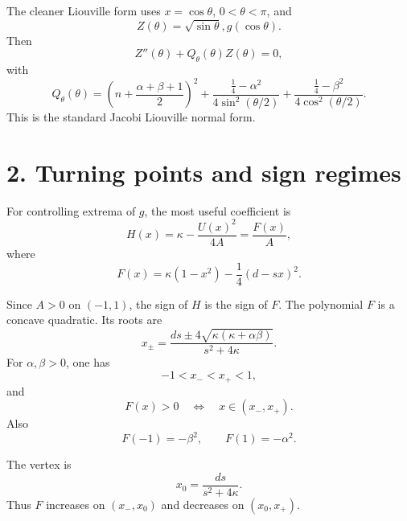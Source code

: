 \documentclass[11pt]{article}
\begin{document}
The cleaner Liouville form uses \(x=\cos\theta\), \(0<\theta<\pi\), and
\begin{equation*}
Z(\theta)=\sqrt{\sin\theta},g(\cos\theta).
\end{equation*}
Then
\begin{equation}
\boxed{
Z''(\theta)+Q_\theta(\theta)Z(\theta)=0,
}
\tag{5}
\end{equation}
with
\begin{equation}
\boxed{
Q_\theta(\theta)
=
\left(n+\frac{\alpha+\beta+1}{2}\right)^2
+
\frac{\frac14-\alpha^2}{4\sin^2(\theta/2)}
+
\frac{\frac14-\beta^2}{4\cos^2(\theta/2)}.
}
\tag{6}
\end{equation}
This is the standard Jacobi Liouville normal form.

\section*{2. Turning points and sign regimes}

For controlling extrema of \(g\), the most useful coefficient is
\begin{equation*}
H(x)=\kappa-\frac{U(x)^2}{4A}
=\frac{F(x)}{A},
\end{equation*}
where
\begin{equation}
\boxed{
F(x)=\kappa(1-x^2)-\frac14(d-sx)^2.
}
\tag{7}
\end{equation}

Since \(A>0\) on \((-1,1)\), the sign of \(H\) is the sign of \(F\). The polynomial \(F\) is a concave quadratic. Its roots are
\begin{equation}
\boxed{
x_\pm
=
\frac{ds\pm 4\sqrt{\kappa(\kappa+\alpha\beta)}}{s^2+4\kappa}.
}
\tag{8}
\end{equation}
For \(\alpha,\beta>0\), one has
\begin{equation*}
-1<x_-<x_+<1,
\end{equation*}
and
\begin{equation*}
F(x)>0 \quad\Longleftrightarrow\quad x\in(x_-,x_+).
\end{equation*}
Also
\begin{equation*}
F(-1)=-\beta^2,\qquad F(1)=-\alpha^2.
\end{equation*}

The vertex is
\begin{equation}
\boxed{
x_0=\frac{ds}{s^2+4\kappa}.
}
\tag{9}
\end{equation}
Thus \(F\) increases on \((x_-,x_0)\) and decreases on \((x_0,x_+)\).
\end{document}
